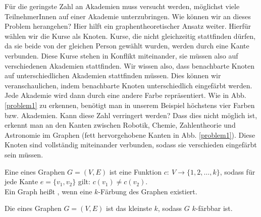 	Für die geringste Zahl an Akademien muss versucht werden, möglichst viele TeilnehmerInnen auf einer Akademie unterzubringen. Wie können wir an dieses Problem herangehen?
Hier hilft ein graphentheoretischer Ansatz weiter. Hierfür wählen wir die Kurse als Knoten.  Kurse, die nicht gleichzeitig stattfinden dürfen, da sie beide von der gleichen Person gewählt wurden, werden durch eine Kante verbunden. Diese Kurse stehen in Konflikt miteinander, sie müssen also auf verschiedenen Akademien stattfinden.
Wir wissen also, dass benachbarte Knoten auf unterschiedlichen Akademien stattfinden müssen. Dies können wir veranschaulichen, indem benachbarte Knoten unterschiedlich eingefärbt werden. Jede Akademie wird dann durch eine andere Farbe repräsentiert. Wie in Abb. \ref{problem1} zu erkennen, benötigt man in unserem Beispiel
 höchstens vier Farben bzw. Akademien. Kann diese Zahl verringert werden?
Dass dies nicht möglich ist, erkennt man an den Kanten zwischen Robotik, Chemie, Zahlentheorie und Astronomie im Graphen (fett hervorgehobene Kanten in Abb. \ref{problem1}). Diese Knoten sind vollständig miteinander verbunden, sodass sie verschieden eingefärbt sein müssen.


	\begin{df}
		Eine  eines Graphen $G=(V,E)$ ist eine Funktion $c:\ V\to\{1,2,\dots,k\}$, sodass für jede Kante $e=\{v_1,v_2\}$ gilt: $c(v_1)\neq c(v_2)$.\\
Ein Graph heißt , wenn eine $k$-Färbung des Graphen existiert.
	\end{df}
	\begin{df}
		Die  eines Graphen $G=(V,E)$ 
 ist das kleinste $k$, sodass $G$ $k$-färbbar ist.
	\end{df}
